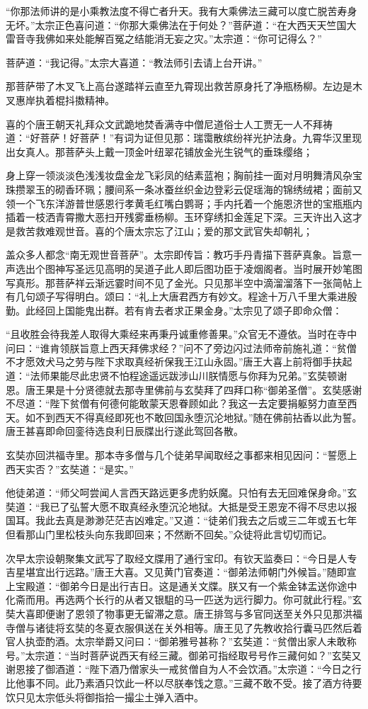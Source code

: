\documentclass[12pt,UTF8]{ctexbook}
\begin{document}
{“你那法师讲的是小乘教法度不得亡者升天。我有大乘佛法三藏可以度亡脱苦寿身无坏。”太宗正色喜问道：“你那大乘佛法在于何处？”菩萨道：“在大西天天竺国大雷音寺我佛如来处能解百冤之结能消无妄之灾。”太宗道：“你可记得么？”

菩萨道：“我记得。”太宗大喜道：“教法师引去请上台开讲。”

那菩萨带了木叉飞上高台遂踏祥云直至九霄现出救苦原身托了净瓶杨柳。左边是木叉惠岸执着棍抖擞精神。

喜的个唐王朝天礼拜众文武跪地焚香满寺中僧尼道俗士人工贾无一人不拜祷道：“好菩萨！好菩萨！”有词为证但见那：瑞霭散缤纷祥光护法身。九霄华汉里现出女真人。那菩萨头上戴一顶金叶纽翠花铺放金光生锐气的垂珠缨络；

身上穿一领淡淡色浅浅妆盘金龙飞彩凤的结素蓝袍；胸前挂一面对月明舞清风杂宝珠攒翠玉的砌香环珮；腰间系一条冰蚕丝织金边登彩云促瑶海的锦绣绒裙；面前又领一个飞东洋游普世感恩行孝黄毛红嘴白鹦哥；手内托着一个施恩济世的宝瓶瓶内插着一枝洒青霄撒大恶扫开残雾垂杨柳。玉环穿绣扣金莲足下深。三天许出入这才是救苦救难观世音。喜的个唐太宗忘了江山；爱的那文武官失却朝礼；

盖众多人都念“南无观世音菩萨”。太宗即传旨：教巧手丹青描下菩萨真象。旨意一声选出个图神写圣远见高明的吴道子此人即后图功臣于凌烟阁者。当时展开妙笔图写真形。那菩萨祥云渐远霎时间不见了金光。只见那半空中滴溜溜落下一张简帖上有几句颂子写得明白。颂曰：“礼上大唐君西方有妙文。程途十万八千里大乘进殷勤。此经回上国能鬼出群。若有肯去者求正果金身。”太宗见了颂子即命众僧：

“且收胜会待我差人取得大乘经来再秉丹诚重修善果。”众官无不遵依。当时在寺中问曰：“谁肯领朕旨意上西天拜佛求经？”问不了旁边闪过法师帝前施礼道：“贫僧不才愿效犬马之劳与陛下求取真经祈保我王江山永固。”唐王大喜上前将御手扶起道：“法师果能尽此忠贤不怕程途遥远跋涉山川朕情愿与你拜为兄弟。”玄奘顿谢恩。唐王果是十分贤德就去那寺里佛前与玄奘拜了四拜口称“御弟圣僧”。玄奘感谢不尽道：“陛下贫僧有何德何能敢蒙天恩眷顾如此？我这一去定要捐躯努力直至西天。如不到西天不得真经即死也不敢回国永堕沉沦地狱。”随在佛前拈香以此为誓。唐王甚喜即命回銮待选良利日辰牒出行遂此驾回各散。

玄奘亦回洪福寺里。那本寺多僧与几个徒弟早闻取经之事都来相见因问：“誓愿上西天实否？”玄奘道：“是实。”

他徒弟道：“师父呵尝闻人言西天路远更多虎豹妖魔。只怕有去无回难保身命。”玄奘道：“我已了弘誓大愿不取真经永堕沉沦地狱。大抵是受王恩宠不得不尽忠以报国耳。我此去真是渺渺茫茫吉凶难定。”又道：“徒弟们我去之后或三二年或五七年但看那山门里松枝头向东我即回来；不然断不回矣。”众徒将此言切切而记。

次早太宗设朝聚集文武写了取经文牒用了通行宝印。有钦天监奏曰：“今日是人专吉星堪宜出行远路。”唐王大喜。又见黄门官奏道：“御弟法师朝门外候旨。”随即宣上宝殿道：“御弟今日是出行吉日。这是通关文牒。朕又有一个紫金钵盂送你途中化斋而用。再选两个长行的从者又银駔的马一匹送为远行脚力。你可就此行程。”玄奘大喜即便谢了恩领了物事更无留滞之意。唐王排驾与多官同送至关外只见那洪福寺僧与诸徒将玄奘的冬夏衣服俱送在关外相等。唐王见了先教收拾行囊马匹然后着官人执壶酌酒。太宗举爵又问曰：“御弟雅号甚称？”玄奘道：“贫僧出家人未敢称号。”太宗道：“当时菩萨说西天有经三藏。御弟可指经取号号作三藏何如？”玄奘又谢恩接了御酒道：“陛下酒乃僧家头一戒贫僧自为人不会饮酒。”太宗道：“今日之行比他事不同。此乃素酒只饮此一杯以尽朕奉饯之意。”三藏不敢不受。接了酒方待要饮只见太宗低头将御指拾一撮尘土弹入酒中。

}
\end{document}
